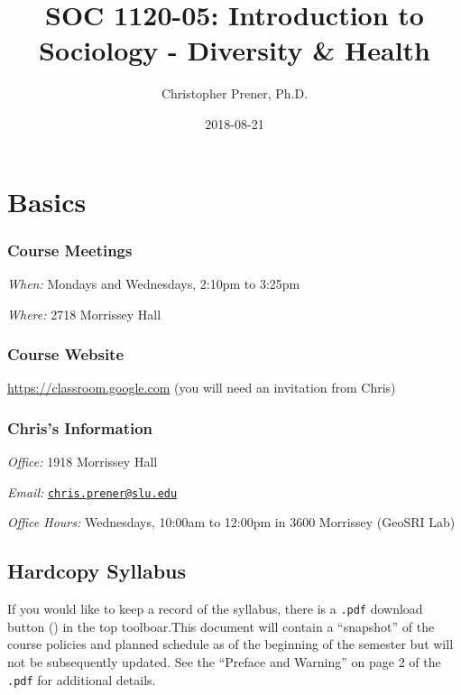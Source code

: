 \documentclass[]{book}
\title{SOC 1120-05: Introduction to Sociology - Diversity \& Health}
\author{Christopher Prener, Ph.D.}
\date{2018-08-21}
\theoremstyle{definition}
\theoremstyle{definition}
\theoremstyle{definition}
\theoremstyle{remark}
\begin{document}
\maketitle

{
\setcounter{tocdepth}{1}
\tableofcontents
}
\hypertarget{basics}{%
\chapter*{Basics}\label{basics}}

\hypertarget{course-meetings}{%
\subsection*{Course Meetings}\label{course-meetings}}

\emph{When:} Mondays and Wednesdays, 2:10pm to 3:25pm

\emph{Where:} 2718 Morrissey Hall

\hypertarget{course-website}{%
\subsection*{Course Website}\label{course-website}}

\url{https://classroom.google.com} (you will need an invitation from
Chris)

\hypertarget{chriss-information}{%
\subsection*{Chris's Information}\label{chriss-information}}

\emph{Office:} 1918 Morrissey Hall

\emph{Email:}
\href{mailto:chris.prener@slu.edu}{\nolinkurl{chris.prener@slu.edu}}

\emph{Office Hours:} Wednesdays, 10:00am to 12:00pm in 3600 Morrissey
(GeoSRI Lab)

\hypertarget{hardcopy-syllabus}{%
\section*{Hardcopy Syllabus}\label{hardcopy-syllabus}}

If you would like to keep a record of the syllabus, there is a
\texttt{.pdf} download button () in the top toolboar.This document will
contain a ``snapshot'' of the course policies and planned schedule as of
the beginning of the semester but will not be subsequently updated. See
the ``Preface and Warning'' on page 2 of the \texttt{.pdf} for
additional details.
\end{document}
